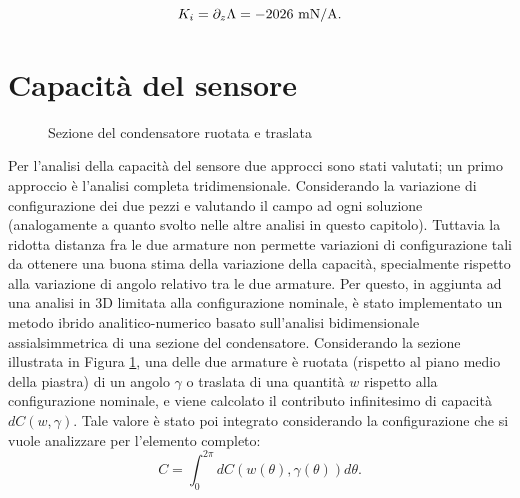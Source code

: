 \begin{equation}
\label{eq:6concflux3}
K_i = \partial_z \Lambda = -2026 \text{ mN/A}.
\end{equation}

\section{Capacità del sensore}
\begin{figure}[hb]
\centering
\caption{Sezione del condensatore ruotata e traslata}
\label{fig:6condsection}
\end{figure}
Per l'analisi della capacità del sensore due approcci sono stati valutati; un primo approccio è l'analisi completa tridimensionale. Considerando la variazione di configurazione dei due pezzi e valutando il campo ad ogni soluzione (analogamente a quanto svolto nelle altre analisi in questo capitolo). Tuttavia la ridotta distanza fra le due armature non permette variazioni di configurazione tali da ottenere una buona stima della variazione della capacità, specialmente rispetto alla variazione di angolo relativo tra le due armature. Per questo, in aggiunta ad una analisi in 3D limitata alla configurazione nominale, è stato implementato un metodo ibrido analitico-numerico basato sull'analisi bidimensionale assialsimmetrica di una sezione del condensatore. Considerando la sezione illustrata in Figura \ref{fig:6condsection}, una delle due armature è ruotata (rispetto al piano medio della piastra) di un angolo  $\gamma$ o traslata di una quantità $w$ rispetto alla configurazione nominale, e viene calcolato il contributo infinitesimo di capacità $dC \left(w,\gamma\right)$. Tale valore è stato poi integrato considerando la configurazione che si vuole analizzare per l'elemento completo:
\begin{equation}
\label{eq:6m4cap2d1}
C = \int_0^{2\pi} dC\left(w\left(\theta\right), \gamma\left(\theta\right)\right) d\theta.
\end{equation}

